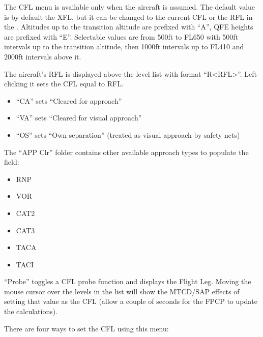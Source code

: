 \documentclass[a4paper,oneside,11pt]{memoir}
\begin{document}
The CFL menu is available only when the aircraft is assumed. The default value is by default the XFL, but it can be changed to the current CFL or the RFL in the . Altitudes up to the transition altitude are prefixed with “A”, QFE heights are prefixed with “E”. Selectable values are from 500ft to FL650 with 500ft intervals up to the transition altitude, then 1000ft intervals up to FL410 and 2000ft intervals above it. 

\bigskip

The aircraft’s RFL is displayed above the level list with format “R<RFL>”. Left-clicking it sets the CFL equal to RFL.

\begin{itemize}
  \item “CA” sets “Cleared for approach”
  \item “VA” sets “Cleared for visual approach”
  \item “OS” sets “Own separation” (treated as visual approach by safety nets)
\end{itemize}

The “APP Clr” folder contains other available approach types to populate the  field:

\begin{itemize}
  \item RNP
  \item VOR
  \item CAT2
  \item CAT3
  \item TACA
  \item TACI
\end{itemize}



\bigskip

“Probe” toggles a CFL probe function and displays the Flight Leg. Moving the mouse cursor over the levels in the list will show the MTCD/SAP effects of setting that value as the CFL (allow a couple of seconds for the FPCP to update the calculations).

\bigskip

There are four ways to set the CFL using this menu:

\bigskip
\end{document}
